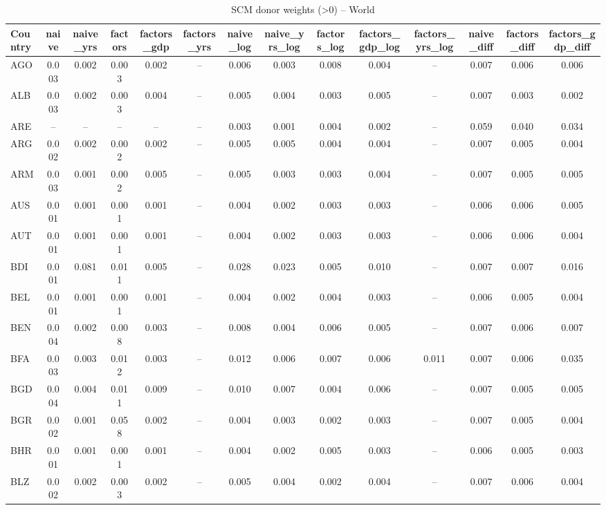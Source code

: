 \begin{longtable}{l*{13}{c}}
\caption{SCM donor weights (>0) -- World}\label{tab:weights-world}\\
\toprule
Country & naive & naive\_yrs & factors & factors\_gdp & factors\_yrs & naive\_log & naive\_yrs\_log & factors\_log & factors\_gdp\_log & factors\_yrs\_log & naive\_diff & factors\_diff & factors\_gdp\_diff \\
\midrule
AGO & 0.003 & 0.002 & 0.003 & 0.002 & -- & 0.006 & 0.003 & 0.008 & 0.004 & -- & 0.007 & 0.006 & 0.006 \\
ALB & 0.003 & 0.002 & 0.003 & 0.004 & -- & 0.005 & 0.004 & 0.003 & 0.005 & -- & 0.007 & 0.003 & 0.002 \\
ARE & -- & -- & -- & -- & -- & 0.003 & 0.001 & 0.004 & 0.002 & -- & 0.059 & 0.040 & 0.034 \\
ARG & 0.002 & 0.002 & 0.002 & 0.002 & -- & 0.005 & 0.005 & 0.004 & 0.004 & -- & 0.007 & 0.005 & 0.004 \\
ARM & 0.003 & 0.001 & 0.002 & 0.005 & -- & 0.005 & 0.003 & 0.003 & 0.004 & -- & 0.007 & 0.005 & 0.005 \\
AUS & 0.001 & 0.001 & 0.001 & 0.001 & -- & 0.004 & 0.002 & 0.003 & 0.003 & -- & 0.006 & 0.006 & 0.005 \\
AUT & 0.001 & 0.001 & 0.001 & 0.001 & -- & 0.004 & 0.002 & 0.003 & 0.003 & -- & 0.006 & 0.006 & 0.004 \\
BDI & 0.001 & 0.081 & 0.011 & 0.005 & -- & 0.028 & 0.023 & 0.005 & 0.010 & -- & 0.007 & 0.007 & 0.016 \\
BEL & 0.001 & 0.001 & 0.001 & 0.001 & -- & 0.004 & 0.002 & 0.004 & 0.003 & -- & 0.006 & 0.005 & 0.004 \\
BEN & 0.004 & 0.002 & 0.008 & 0.003 & -- & 0.008 & 0.004 & 0.006 & 0.005 & -- & 0.007 & 0.006 & 0.007 \\
BFA & 0.003 & 0.003 & 0.012 & 0.003 & -- & 0.012 & 0.006 & 0.007 & 0.006 & 0.011 & 0.007 & 0.006 & 0.035 \\
BGD & 0.004 & 0.004 & 0.011 & 0.009 & -- & 0.010 & 0.007 & 0.004 & 0.006 & -- & 0.007 & 0.005 & 0.005 \\
BGR & 0.002 & 0.001 & 0.058 & 0.002 & -- & 0.004 & 0.003 & 0.002 & 0.003 & -- & 0.007 & 0.005 & 0.004 \\
BHR & 0.001 & 0.001 & 0.001 & 0.001 & -- & 0.004 & 0.002 & 0.005 & 0.003 & -- & 0.006 & 0.005 & 0.003 \\
BLZ & 0.002 & 0.002 & 0.003 & 0.002 & -- & 0.005 & 0.004 & 0.002 & 0.004 & -- & 0.007 & 0.006 & 0.004 \\

\end{longtable}
